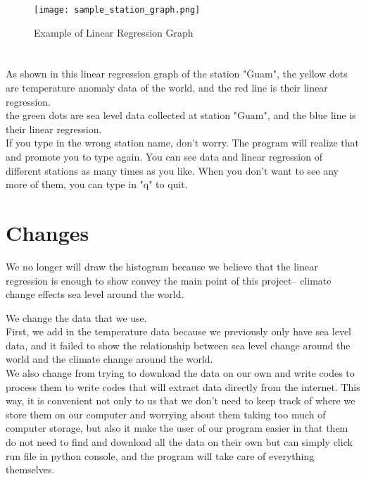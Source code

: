 \documentclass[fontsize=11pt]{article}
\begin{document}
   \begin{figure}[h!]
   \centering
   \texttt{[image: sample\_station\_graph.png]}
   \caption{Example of Linear Regression Graph}
   \label{fig:sample_station_graph.png}
   \end{figure}
  
   \section*{}
   As shown in this linear regression graph of the station "Guam", the yellow dots are temperature anomaly data of the world, and the red line is their linear regression.\\
   the green dots are sea level data collected at station "Guam", and the blue line is their linear regression.\\
   If you type in the wrong station name, don't worry. The program will realize that and promote you to type again. You can see data and linear regression of different stations as many times as you like. When you don't want to see any more of them, you can type in "q" to quit.
   
   \section*{Changes}
   \item
   We no longer will draw the histogram because we believe that the linear regression is enough to show convey the main point of this project-- climate change effects sea level around the world.
   
   \item
   We change the data that we use.\\
   First, we add in the temperature data because we previously only have sea level data, and it failed to show the relationship between sea level change around the world and the climate change around the world.\\
   We also change from trying to download the data on our own and write codes to process them to write codes that will extract data directly from the internet. This way, it is convenient not only to us that we don't need to keep track of where we store them on our computer and worrying about them taking too much of computer storage, but also it make the user of our program easier in that them do not need to find and download all the data on their own but can simply click run file in python console, and the program will take care of everything themselves.\\
   
\end{document}
